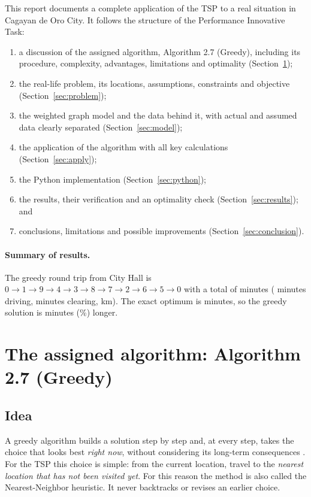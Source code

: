 \documentclass[11pt,a4paper]{article}
\begin{document}
This report documents a complete application of the TSP to a real situation in Cagayan de Oro City. It follows the structure of the Performance Innovative Task:
\begin{enumerate}[noitemsep]
  \item a discussion of the assigned algorithm, Algorithm 2.7 (Greedy), including its procedure, complexity, advantages, limitations and optimality (Section~\ref{sec:algorithm});
  \item the real-life problem, its locations, assumptions, constraints and objective (Section~\ref{sec:problem});
  \item the weighted graph model and the data behind it, with actual and assumed data clearly separated (Section~\ref{sec:model});
  \item the application of the algorithm with all key calculations (Section~\ref{sec:apply});
  \item the Python implementation (Section~\ref{sec:python});
  \item the results, their verification and an optimality check (Section~\ref{sec:results}); and
  \item conclusions, limitations and possible improvements (Section~\ref{sec:conclusion}).
\end{enumerate}

\paragraph{Summary of results.} The greedy round trip from City Hall is $0 \to 1 \to 9 \to 4 \to 3 \to 8 \to 7 \to 2 \to 6 \to 5 \to 0$ with a total of \GreedyTotal{} minutes (\GreedyTravel{} minutes driving, \GreedyClear{} minutes clearing, \GreedyKm{} km). The exact optimum is \OptTotal{} minutes, so the greedy solution is \GapMin{} minutes (\GapPct\%) longer.

\section{The assigned algorithm: Algorithm 2.7 (Greedy)}\label{sec:algorithm}
\subsection{Idea}
A greedy algorithm builds a solution step by step and, at every step, takes the choice that looks best \emph{right now}, without considering its long-term consequences \cite{luna2024}. For the TSP this choice is simple: from the current location, travel to the \emph{nearest location that has not been visited yet}. For this reason the method is also called the Nearest-Neighbor heuristic. It never backtracks or revises an earlier choice.
\end{document}
